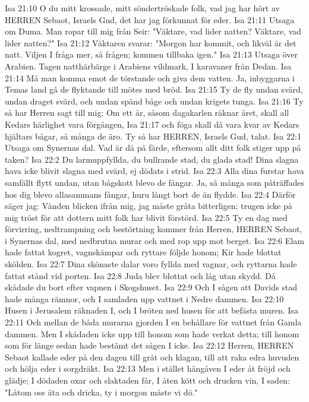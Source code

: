 Isa 21:10  O du mitt krossade, mitt söndertröskade folk, vad jag har hört av HERREN Sebaot, Israels Gud, det har jag förkunnat för eder.
Isa 21:11  Utsaga om Duma. Man ropar till mig från Seir: "Väktare, vad lider natten? Väktare, vad lider natten?"
Isa 21:12  Väktaren svarar: "Morgon har kommit, och likväl är det natt. Viljen I fråga mer, så frågen; kommen tillbaka igen."
Isa 21:13  Utsaga över Arabien. Tagen natthärbärge i Arabiens vildmark, I karavaner från Dedan.
Isa 21:14  Må man komma emot de törstande och giva dem vatten. Ja, inbyggarna i Temas land gå de flyktande till mötes med bröd.
Isa 21:15  Ty de fly undan svärd, undan draget svärd, och undan spänd båge och undan krigets tunga.
Isa 21:16  Ty så har Herren sagt till mig: Om ett år, såsom dagakarlen räknar året, skall all Kedars härlighet vara förgången,
Isa 21:17  och föga skall då vara kvar av Kedars hjältars bågar, så många de äro. Ty så har HERREN, Israels Gud, talat.
Isa 22:1  Utsaga om Synernas dal. Vad är då på färde, eftersom allt ditt folk stiger upp på taken?
Isa 22:2  Du larmuppfyllda, du bullrande stad, du glada stad! Dina slagna hava icke blivit slagna med svärd, ej dödats i strid.
Isa 22:3  Alla dina furstar hava samfällt flytt undan, utan bågskott blevo de fångar. Ja, så många som påträffades hos dig blevo allasammans fångar, huru långt bort de än flydde.
Isa 22:4  Därför säger jag: Vänden blicken ifrån mig, jag måste gråta bitterligen; trugen icke på mig tröst för att dottern mitt folk har blivit förstörd.
Isa 22:5  Ty en dag med förvirring, nedtrampning och bestörtning kommer från Herren, HERREN Sebaot, i Synernas dal, med nedbrutna murar och med rop upp mot berget.
Isa 22:6  Elam hade fattat kogret, vagnskämpar och ryttare följde honom; Kir hade blottat skölden.
Isa 22:7  Dina skönaste dalar voro fyllda med vagnar, och ryttarna hade fattat stånd vid porten.
Isa 22:8  Juda blev blottat och låg utan skydd. Då skådade du bort efter vapnen i Skogshuset.
Isa 22:9  Och I sågen att Davids stad hade många rämnor, och I samladen upp vattnet i Nedre dammen.
Isa 22:10  Husen i Jerusalem räknaden I, och I bröten ned husen för att befästa muren.
Isa 22:11  Och mellan de båda murarna gjorden I en behållare för vattnet från Gamla dammen. Men I skådaden icke upp till honom som hade verkat detta; till honom som för länge sedan hade bestämt det sågen I icke.
Isa 22:12  Herren, HERREN Sebaot kallade eder på den dagen till gråt och klagan, till att raka edra huvuden och hölja eder i sorgdräkt.
Isa 22:13  Men i stället hängåven I eder åt fröjd och glädje; I dödaden oxar och slaktaden får, I åten kött och drucken vin, I saden: "Låtom oss äta och dricka, ty i morgon måste vi dö."

